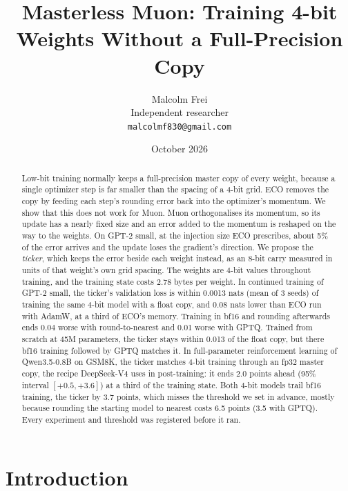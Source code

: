 \documentclass[11pt]{article}
\title{Masterless Muon: Training 4-bit Weights Without a Full-Precision Copy}
\author{Malcolm Frei\\ Independent researcher\\ \texttt{malcolmf830@gmail.com}}
\date{October 2026}
\begin{document}
\maketitle

\begin{abstract}
Low-bit training normally keeps a full-precision master copy of every weight, because a single optimizer step is far
smaller than the spacing of a 4-bit grid. ECO removes the copy by feeding each step's rounding error back into the
optimizer's momentum. We show that this does not work for Muon. Muon orthogonalises its momentum, so its update has
a nearly fixed size and an error added to the momentum is reshaped on the way to the weights. On GPT-2 small, at the
injection size ECO prescribes, about 5\% of the error arrives and the update loses the gradient's direction. We
propose the \emph{ticker}, which keeps the error beside each weight instead, as an 8-bit carry measured in units of
that weight's own grid spacing. The weights are 4-bit values throughout training, and the training state costs 2.78
bytes per weight. In continued training of GPT-2 small, the ticker's validation loss is within 0.0013 nats (mean of 3
seeds) of training the same 4-bit model with a float copy, and 0.08 nats lower than ECO run with AdamW, at a third of
ECO's memory. Training in bf16
and rounding afterwards ends 0.04 worse with round-to-nearest and 0.01 worse with GPTQ. Trained from scratch at 45M
parameters, the ticker stays within 0.013 of the float copy, but there bf16 training followed by GPTQ matches it. In
full-parameter reinforcement learning of Qwen3.5-0.8B on GSM8K, the ticker matches 4-bit training through an fp32
master copy, the recipe DeepSeek-V4 uses in post-training: it ends 2.0 points ahead (95\% interval $[+0.5, +3.6]$) at a
third of the training state. Both 4-bit models trail bf16 training, the ticker by 3.7 points, which misses the threshold
we set in advance, mostly because rounding the starting model to nearest costs 6.5 points (3.5 with GPTQ). Every
experiment and threshold was registered before it ran.
\end{abstract}

\section{Introduction}
\end{document}
